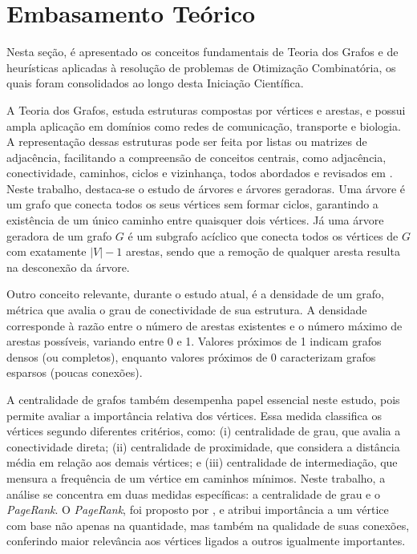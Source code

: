 \section{Embasamento Teórico}
\label{sec-embasamento}

Nesta seção, é apresentado os conceitos fundamentais de Teoria dos Grafos e de heurísticas aplicadas à resolução de problemas de Otimização Combinatória, os quais foram consolidados ao longo desta Iniciação Científica.

A Teoria dos Grafos, estuda estruturas compostas por vértices e arestas, e possui ampla aplicação em domínios como redes de comunicação, transporte e biologia. A representação dessas estruturas pode ser feita por listas ou matrizes de adjacência, facilitando a compreensão de conceitos centrais, como adjacência, conectividade, caminhos, ciclos e vizinhança, todos abordados e revisados em \cite{grafos:2017}. Neste trabalho, destaca-se o estudo de árvores e árvores geradoras. Uma árvore é um grafo que conecta todos os seus vértices sem formar ciclos, garantindo a existência de um único caminho entre quaisquer dois vértices. Já uma árvore geradora de um grafo $G$ é um subgrafo acíclico que conecta todos os vértices de $G$ com exatamente $|V| - 1$ arestas, sendo que a remoção de qualquer aresta resulta na desconexão da árvore.

Outro conceito relevante, durante o estudo atual, é a densidade de um grafo, métrica que avalia o grau de conectividade de sua estrutura. A densidade corresponde à razão entre o número de arestas existentes e o número máximo de arestas possíveis, variando entre 0 e 1. Valores próximos de 1 indicam grafos densos (ou completos), enquanto valores próximos de 0 caracterizam grafos esparsos (poucas conexões). 

A centralidade de grafos também desempenha papel essencial neste estudo, pois permite avaliar a importância relativa dos vértices. Essa medida classifica os vértices segundo diferentes critérios, como: (i) centralidade de grau, que avalia a conectividade direta; (ii) centralidade de proximidade, que considera a distância média em relação aos demais vértices; e (iii) centralidade de intermediação, que mensura a frequência de um vértice em caminhos mínimos. Neste trabalho, a análise se concentra em duas medidas específicas: a centralidade de grau e o \textit{PageRank}.  O \textit{PageRank}, foi proposto por \cite{PageRank:1998}, e atribui importância a um vértice com base não apenas na quantidade, mas também na qualidade de suas conexões, conferindo maior relevância aos vértices ligados a outros igualmente importantes. 

